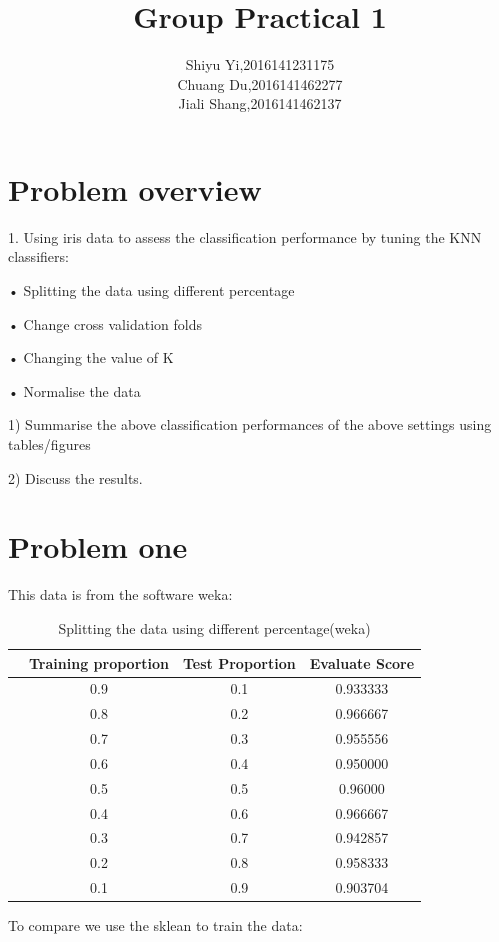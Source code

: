\documentclass[a4pper,11pt,onecolumn]{article}
\title{Group Practical 1 }
\author[*]{Shiyu Yi,2016141231175\\Chuang Du,2016141462277\\Jiali Shang,2016141462137}
\begin{document}
\maketitle

\section{Problem overview}
1. Using iris data to assess the classification performance by tuning the KNN
classifiers:

• Splitting the data using different percentage

• Change cross validation folds

• Changing the value of K

• Normalise the data

1) Summarise the above classification performances of the above settings
using tables/figures 

2) Discuss the results.
 
\section{Problem one}

This data is from the software weka:
 
\begin{table}[h]  %
	\centering  %
	\caption{Splitting the data using different percentage(weka)}  %
	\begin{tabular}{cccc}  %
		\hline
		\hline
		& Training proportion & Test Proportion & Evaluate Score \\ [0.5ex] 
		\hline
		& 0.9 & 0.1 & 0.933333   \\
		& 0.8 & 0.2 & 0.966667  \\
		& 0.7 & 0.3 & 0.955556  \\
		& 0.6 & 0.4 & 0.950000    \\
		& 0.5 & 0.5 & 0.96000 \\
		& 0.4 & 0.6 & 0.966667\\
		& 0.3 & 0.7 & 0.942857 \\
		& 0.2 & 0.8 & 0.958333  \\
		& 0.1 & 0.9 & 0.903704  \\
		\hline
		\hline
	\end{tabular}
\end{table}

To compare we use the sklean to train the data:
\end{document}
